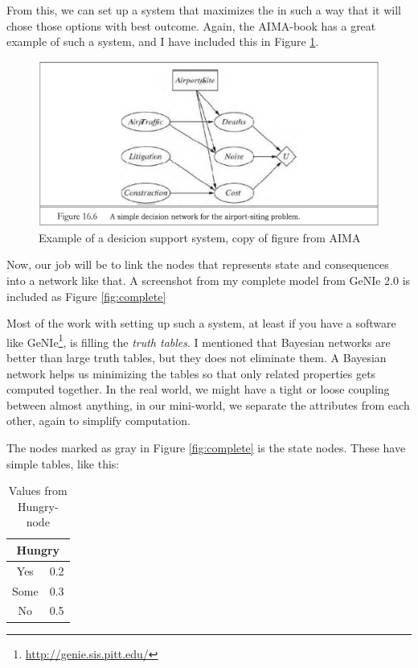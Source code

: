 From this, we can set up a system that maximizes the \cite{aima} in such a way that it will chose those options with best
outcome. Again, the AIMA-book has a great example of such a system, and I have
included this in Figure \ref{fig:dssExample}. \begin{figure}[h]
\includegraphics[width=122mm]{figure-example2.png}
\caption{Example of a desicion support system, copy of figure from
AIMA\cite{aima}}
\label{fig:dssExample}
\end{figure}

Now, our job will be to link the nodes that represents state and consequences
into a network like that. A screenshot from my complete model from GeNIe 2.0
is included as Figure \ref{fig:complete}

Most of the work with setting up such a system, at least if you have a software
like GeNIe\footnote{\url{http://genie.sis.pitt.edu/}}, is filling the
\emph{truth tables}. I mentioned that Bayesian networks are better than large
truth tables, but they does not eliminate them. A Bayesian network helps us minimizing the tables so that only related
properties gets computed together. In the real world, we might have a tight or
loose coupling between almost anything, in our mini-world, we separate the
attributes from each other, again to simplify computation.


The nodes marked as gray in Figure \ref{fig:complete} is the state nodes. These
have simple tables, like this:
\begin{table}[h!!!!!!!!!!]

\begin{tabular}{|c|c|}
\hline
\multicolumn{2}{|c|}{Hungry}\\
\hline
Yes & 0.2\\
Some & 0.3\\
No & 0.5\\
\hline
\end{tabular}
\label{tab:hungry}
\caption{Values from Hungry-node}
\end{table}


